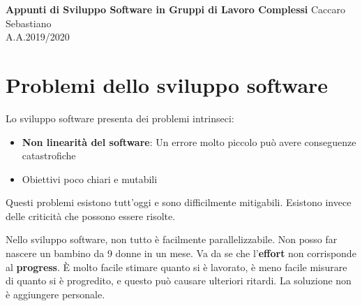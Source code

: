 \documentclass[a4paper,12pt]{article}
\begin{document}
\begin{titlepage}
\begin{center}
	\Large{\textbf{Appunti di Sviluppo Software in Gruppi di Lavoro Complessi}}
\vfill
\normalsize{Caccaro Sebastiano}\\
\normalsize{A.A.2019/2020}
\end{center}
\end{titlepage}


\clearpage


\section{Problemi dello sviluppo software}
Lo sviluppo software presenta dei problemi intrinseci:
\begin{itemize}
\item \textbf{Non linearità del software}: Un errore molto piccolo può avere conseguenze catastrofiche
\item Obiettivi poco chiari e mutabili
\end{itemize}
Questi problemi esistono tutt'oggi e sono difficilmente mitigabili. Esistono invece delle criticità che possono essere risolte.


Nello sviluppo software, non tutto è facilmente parallelizzabile. Non posso far nascere un bambino da 9 donne in un mese. Va da se che l'\textbf{effort} non corrisponde al \textbf{progress}. \`E molto facile stimare quanto si è lavorato, è meno facile misurare di quanto si è progredito, e questo può causare ulteriori ritardi. La soluzione non è aggiungere personale.
\end{document}
